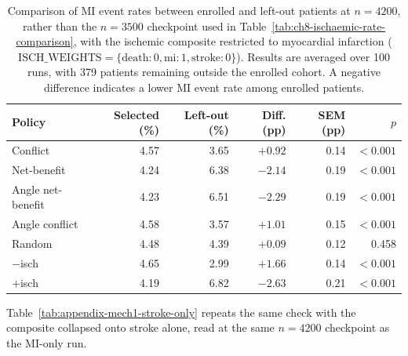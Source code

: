 \begin{table}[htbp]
    \centering
    \small
    \setlength{\tabcolsep}{6pt}
    \begin{tabular}{lrrrrr}
        \toprule
        Policy & Selected (\%) & Left-out (\%) & Diff. (pp) & SEM (pp) & $p$ \\
        \midrule
        Conflict           & 4.57 & 3.65 & $+0.92$ & 0.14 & $<0.001$ \\
        Net-benefit        & 4.24 & 6.38 & $-2.14$ & 0.19 & $<0.001$ \\
        Angle net-benefit  & 4.23 & 6.51 & $-2.29$ & 0.19 & $<0.001$ \\
        Angle conflict     & 4.58 & 3.57 & $+1.01$ & 0.15 & $<0.001$ \\
        Random             & 4.48 & 4.39 & $+0.09$ & 0.12 & 0.458 \\
        $-$isch            & 4.65 & 2.99 & $+1.66$ & 0.14 & $<0.001$ \\
        $+$isch            & 4.19 & 6.82 & $-2.63$ & 0.21 & $<0.001$ \\
        \bottomrule
    \end{tabular}
    \caption{Comparison of MI event rates between enrolled and left-out patients at
    $n=4200$, rather than the $n=3500$ checkpoint used in
    Table~\ref{tab:ch8-ischaemic-rate-comparison}, with the ischemic composite restricted
    to myocardial infarction
    ($\text{ISCH\_WEIGHTS} = \{\text{death}: 0, \text{mi}: 1, \text{stroke}: 0\}$).
    Results are averaged over 100 runs, with 379 patients remaining outside the enrolled
    cohort. A negative difference indicates a lower MI event rate among enrolled
    patients.}
    \label{tab:appendix-mech1-mi-only}
\end{table}

Table~\ref{tab:appendix-mech1-stroke-only} repeats the same check with the composite
collapsed onto stroke alone, read at the same $n=4200$ checkpoint as the MI-only run.

